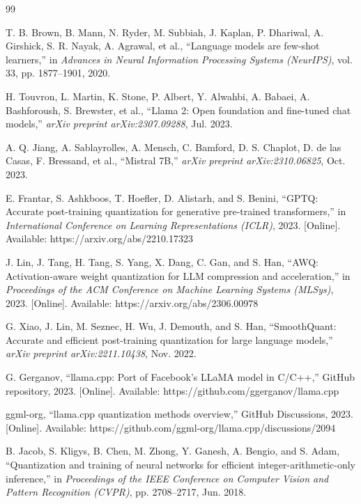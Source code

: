 \documentclass[journal]{IEEEtran}
\begin{document}
\begin{thebibliography}{99}

T. B. Brown, B. Mann, N. Ryder, M. Subbiah, J. Kaplan, P. Dhariwal, A. Girshick, S. R. Nayak, A. Agrawal, et al., ``Language models are few-shot learners,'' in \textit{Advances in Neural Information Processing Systems (NeurIPS)}, vol. 33, pp. 1877--1901, 2020.

H. Touvron, L. Martin, K. Stone, P. Albert, Y. Alwahbi, A. Babaei, A. Bashforoush, S. Brewster, et al., ``Llama 2: Open foundation and fine-tuned chat models,'' \textit{arXiv preprint arXiv:2307.09288}, Jul. 2023.

A. Q. Jiang, A. Sablayrolles, A. Mensch, C. Bamford, D. S. Chaplot, D. de las Casas, F. Bressand, et al., ``Mistral 7B,'' \textit{arXiv preprint arXiv:2310.06825}, Oct. 2023.

E. Frantar, S. Ashkboos, T. Hoefler, D. Alistarh, and S. Benini, ``GPTQ: Accurate post-training quantization for generative pre-trained transformers,'' in \textit{International Conference on Learning Representations (ICLR)}, 2023. [Online]. Available: https://arxiv.org/abs/2210.17323

J. Lin, J. Tang, H. Tang, S. Yang, X. Dang, C. Gan, and S. Han, ``AWQ: Activation-aware weight quantization for LLM compression and acceleration,'' in \textit{Proceedings of the ACM Conference on Machine Learning Systems (MLSys)}, 2023. [Online]. Available: https://arxiv.org/abs/2306.00978

G. Xiao, J. Lin, M. Seznec, H. Wu, J. Demouth, and S. Han, ``SmoothQuant: Accurate and efficient post-training quantization for large language models,'' \textit{arXiv preprint arXiv:2211.10438}, Nov. 2022.

G. Gerganov, ``llama.cpp: Port of Facebook's LLaMA model in C/C++,'' GitHub repository, 2023. [Online]. Available: https://github.com/ggerganov/llama.cpp

ggml-org, ``llama.cpp quantization methods overview,'' GitHub Discussions, 2023. [Online]. Available: https://github.com/ggml-org/llama.cpp/discussions/2094

B. Jacob, S. Kligys, B. Chen, M. Zhong, Y. Ganesh, A. Bengio, and S. Adam, ``Quantization and training of neural networks for efficient integer-arithmetic-only inference,'' in \textit{Proceedings of the IEEE Conference on Computer Vision and Pattern Recognition (CVPR)}, pp. 2708--2717, Jun. 2018.


\end{thebibliography}
\end{document}
